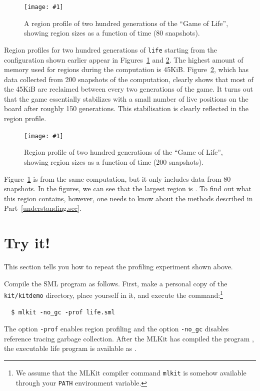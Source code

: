 \documentclass[12pt]{book}
\begin{document}
\newcommand{\includerp}[1]{\texttt{[image: \#1]}}

\begin{figure}
\includerp{life80.pdf}
\caption{A region profile of two hundred
  generations of the ``Game of Life'', showing region sizes as a
  function of time (80 snapshots).}
\label{lifeprof80.fig}
\end{figure}

Region profiles for two hundred generations of {\tt life} starting
from the configuration shown earlier appear in
Figures~\ref{lifeprof80.fig} and \ref{lifeprof200.fig}.  The highest
amount of memory used for regions during the computation is
45KiB. Figure~\ref{lifeprof200.fig}, which has data collected from 200
snapshots of the computation, clearly shows that most of the 45KiB are
reclaimed between every two generations of the game. It turns out that
the game essentially stabilizes with a small number of live positions
on the board after roughly 150 generations.  This stabilisation is
clearly reflected in the region profile.

\begin{figure}
\includerp{life200.pdf}
\caption{Region profile of two hundred
  generations of the ``Game of Life'', showing region sizes as a
  function of time (200 snapshots).}
\label{lifeprof200.fig}
\end{figure}

Figure~\ref{lifeprof80.fig} is from the same computation, but it only
includes data from 80 snapshots. In the figures, we can see that the
largest region is . To find out what this region
contains, however, one needs to know about the methods described in
Part~\ref{understanding.sec}.

\section{Try it!}
This section tells you how to repeat the profiling experiment shown
above.

Compile the SML program  as follows. First,
make a personal copy of the {\tt kit/kitdemo} directory, place
yourself in it, and execute the command:\footnote{We assume that the
  MLKit compiler command \texttt{mlkit} is somehow available through
  your {\tt PATH} environment variable.}
\begin{verbatim}
  $ mlkit -no_gc -prof life.sml
\end{verbatim}
The option \texttt{-prof} enables region profiling and the option
\texttt{-no\_gc} disables reference tracing garbage collection. After
the MLKit has compiled the program , the executable
life program is available as .
\end{document}
